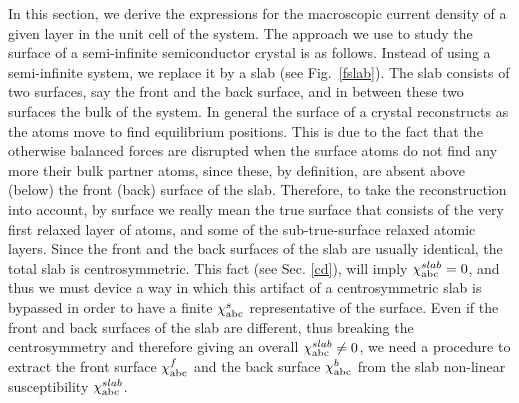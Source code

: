 \documentclass[floatfix,prb,aps,superscriptaddress,11pt,preprint]{revtex4}
\begin{document}
In this section, we derive the expressions for the macroscopic current
density of a given layer in the unit cell of the system.
The approach we use to study the surface of a semi-infinite
semiconductor crystal is as follows. Instead of using a
semi-infinite system, we replace it by a slab (see Fig.~\ref{fslab}).
The slab consists of
two surfaces, say the front and the back surface, and in between these
two surfaces the bulk of the system. 
In
general the surface of a crystal reconstructs as the atoms
move to find equilibrium positions. This is due to the fact that
the otherwise
balanced forces are disrupted when the surface atoms do not find any
more their bulk partner atoms, since these, by definition, are absent
above (below) the front (back) surface of the slab. 
Therefore, to take the reconstruction into account, by surface we really mean
the true surface that consists of the very first relaxed layer of atoms, and
some of the sub-true-surface relaxed atomic layers.
Since the front and the back
surfaces of the slab are usually identical, the total slab is
centrosymmetric. This fact (see Sec. \ref{cd}), will imply $\chi^{slab}_{\mathrm{a}\mathrm{b}\mathrm{c}}=0$, and thus we must
device a way in which this artifact of a centrosymmetric slab is
bypassed in order to have a finite $\chi^s_{\mathrm{a}\mathrm{b}\mathrm{c}}$ representative of the
surface. Even if the front and back surfaces of the slab 
are different, thus breaking the centrosymmetry and therefore giving an
overall $\chi^{slab}_{\mathrm{a}\mathrm{b}\mathrm{c}}\ne 0$, we
need a procedure to extract the front surface $\chi^f_{\mathrm{a}\mathrm{b}\mathrm{c}}$
and
the back surface $\chi^b_{\mathrm{a}\mathrm{b}\mathrm{c}}$ from the slab non-linear
susceptibility $\chi^{slab}_{\mathrm{a}\mathrm{b}\mathrm{c}}$.
\end{document}

